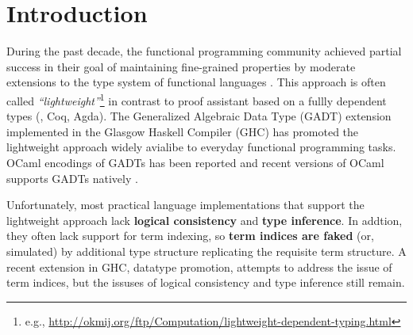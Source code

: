 \section{Introduction}
During the past decade, the functional programming community achieved
partial success in their goal of maintaining fine-grained properties
by moderate extensions to the type system of functional languages
\cite{CheHin03,CheHin02,Xi03}.
This approach is often called \emph{``lightweight''}\footnote{e.g.,
  \url{http://okmij.org/ftp/Computation/lightweight-dependent-typing.html} }
in contrast to proof assistant based on a fullly dependent types
(\eg, Coq, Agda).
The Generalized Algebraic Data Type (GADT) extension implemented
in the Glasgow Haskell Compiler (GHC) has promoted the lightweight approach
widely avialibe to everyday functional programming tasks.
OCaml encodings of GADTs has been reported \cite{ManStu09}
and recent versions of OCaml supports GADTs natively \cite{GarNor11}.

Unfortunately, most practical language implementations that support
the lightweight approach lack \textbf{logical consistency} and
\textbf{type inference}. In addtion, they often lack support for
term indexing, so \textbf{term indices are faked} (or, simulated)
by additional type structure replicating the requisite term structure.
A recent extension in GHC, datatype promotion, attempts to address
the issue of term indices, but the issuses of logical consistency
and type inference still remain.

